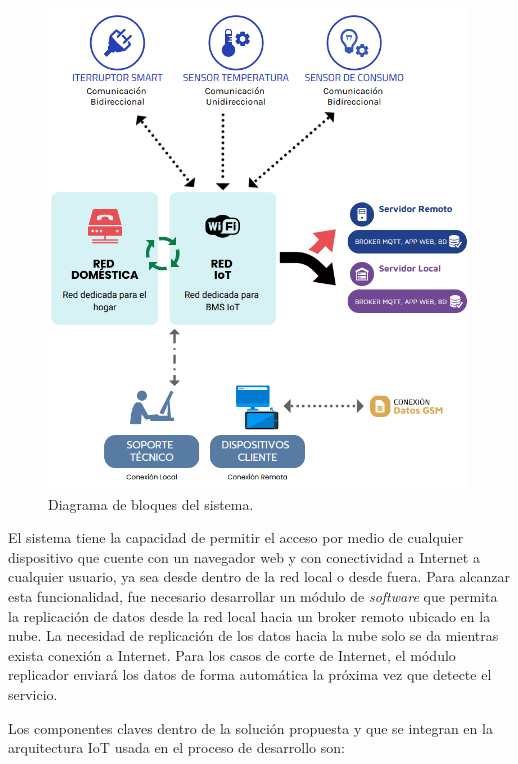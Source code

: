\begin{figure}[htbp]
	\centering
	\includegraphics[width=0.99\textwidth]{./Figures/bloques.png}
	\caption{Diagrama de bloques del sistema.}

	\label{fig:diagrama1}
\end{figure}

El sistema tiene la capacidad de permitir el acceso por medio de cualquier dispositivo que cuente con un navegador web y con conectividad a Internet a cualquier usuario, ya sea desde dentro de la red local o desde fuera. Para alcanzar esta funcionalidad, fue necesario desarrollar un módulo de \emph{software} que permita la replicación de datos desde la red local hacia un broker remoto ubicado en la nube. La necesidad de replicación de los datos hacia la nube solo se da mientras exista conexión a Internet. Para los casos de corte de Internet, el módulo replicador enviará los datos de forma automática la próxima vez que detecte el servicio.%

Los componentes claves dentro de la solución propuesta y que se integran en la arquitectura IoT usada en el proceso de desarrollo son: 

